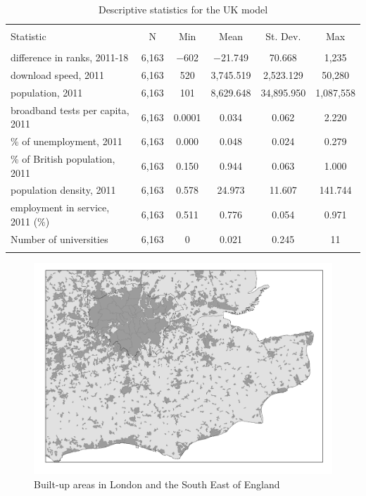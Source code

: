 \documentclass[10pt,letterpaper]{article}
\begin{document}
\begin{table}[!htbp] \centering 
  \caption{Descriptive statistics for the UK model\label{desc.uk}} 
  \label{} 
\small 
\begin{tabular}{@{\extracolsep{5pt}}lccccc} 
\\[-1.8ex]\hline 
\hline \\[-1.8ex] 
Statistic & \multicolumn{1}{c}{N} & \multicolumn{1}{c}{Min} & \multicolumn{1}{c}{Mean} & \multicolumn{1}{c}{St. Dev.} & \multicolumn{1}{c}{Max} \\ 
\hline \\[-1.8ex] 
difference in ranks, 2011-18 & 6,163 & $-$602 & $-$21.749 & 70.668 & 1,235 \\ 
download speed, 2011 & 6,163 & 520 & 3,745.519 & 2,523.129 & 50,280 \\ 
population, 2011 & 6,163 & 101 & 8,629.648 & 34,895.950 & 1,087,558 \\ 
broadband tests per capita, 2011 & 6,163 & 0.0001 & 0.034 & 0.062 & 2.220 \\ 
\% of unemployment, 2011 & 6,163 & 0.000 & 0.048 & 0.024 & 0.279 \\ 
\% of British population, 2011 & 6,163 & 0.150 & 0.944 & 0.063 & 1.000 \\ 
population density, 2011 & 6,163 & 0.578 & 24.973 & 11.607 & 141.744 \\ 
employment in service, 2011 (\%) & 6,163 & 0.511 & 0.776 & 0.054 & 0.971 \\ 
Number of universities & 6,163 & 0 & 0.021 & 0.245 & 11 \\ 
\hline \\[-1.8ex] 
\end{tabular} 
\end{table}

\begin{figure}
\includegraphics[width=0.8\linewidth]{Figure1} \caption{\label{figure1}Built-up areas in London and the South East of England}\label{fig:unnamed-chunk-11}
\end{figure}
\end{document}
